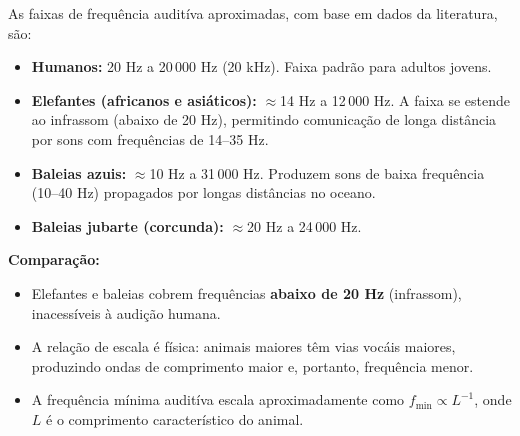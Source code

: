 As faixas de frequência auditíva aproximadas, com base em dados da literatura, são:

\begin{itemize}
\item \textbf{Humanos:} 20 Hz a 20\,000 Hz (20 kHz). Faixa padrão para adultos jovens.
\item \textbf{Elefantes (africanos e asiáticos):} $\approx$14 Hz a 12\,000 Hz. A faixa se estende ao infrassom (abaixo de 20 Hz), permitindo comunicação de longa distância por sons com frequências de 14--35 Hz.
\item \textbf{Baleias azuis:} $\approx$10 Hz a 31\,000 Hz. Produzem sons de baixa frequência (10--40 Hz) propagados por longas distâncias no oceano.
\item \textbf{Baleias jubarte (corcunda):} $\approx$20 Hz a 24\,000 Hz.
\end{itemize}

\textbf{Comparação:}
\begin{itemize}
\item Elefantes e baleias cobrem frequências \textbf{abaixo de 20 Hz} (infrassom), inacessíveis à audição humana.
\item A relação de escala é física: animais maiores têm vias vocáis maiores, produzindo ondas de comprimento maior e, portanto, frequência menor.
\item A frequência mínima auditíva escala aproximadamente como $f_{\min} \propto L^{-1}$, onde $L$ é o comprimento característico do animal.
\end{itemize}

